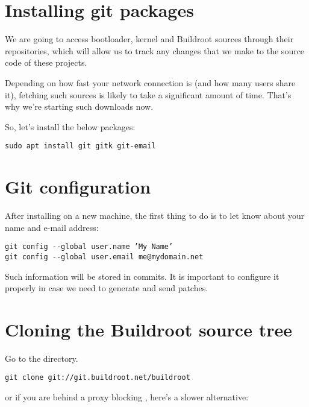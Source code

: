 
\section{Installing git packages}

We are going to access bootloader, kernel and Buildroot sources through
their  repositories, which will allow us to track any changes
that we make to the source code of these projects.

Depending on how fast your network connection is (and how many users
share it), fetching such sources is likely to take a significant amount
of time. That's why we're starting such downloads now.

So, let's install the below packages:

\begin{verbatim}
sudo apt install git gitk git-email
\end{verbatim}

\section{Git configuration}

After installing  on a new machine, the first thing to do is
to let  know about your name and e-mail address:

\begin{verbatim}
git config --global user.name ’My Name’
git config --global user.email me@mydomain.net
\end{verbatim}

Such information will be stored in commits. It is important
to configure it properly in case we need to generate and
send patches.

\section{Cloning the Buildroot source tree}

Go to the  directory.

\begin{verbatim}
git clone git://git.buildroot.net/buildroot
\end{verbatim}

or if you are behind a proxy blocking , here's a slower
alternative:

